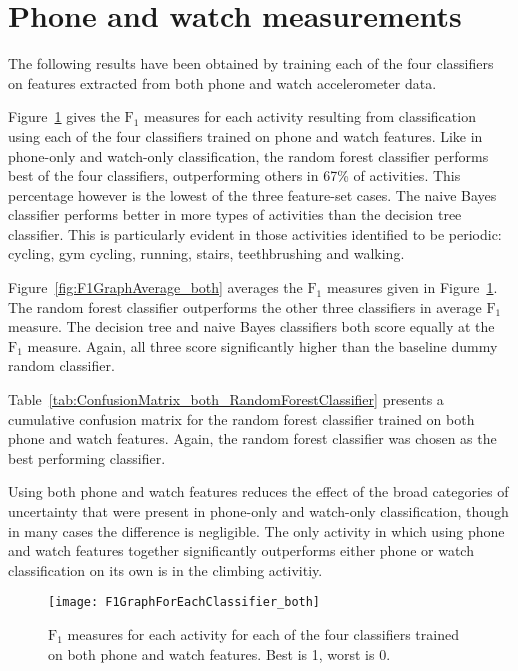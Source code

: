   
  \section{Phone and watch measurements}
    The following results have been obtained by training each of the four classifiers on features extracted from both phone and watch accelerometer data.
    
    Figure~\ref{fig:F1GraphForEachClassifier_both} gives the $\mathrm{F}_1$ measures for each activity resulting from classification using each of the four classifiers trained on phone and watch features. Like in phone-only and watch-only classification, the random forest classifier performs best of the four classifiers, outperforming others in 67\% of activities. This percentage however is the lowest of the three feature-set cases. The naive Bayes classifier performs better in more types of activities than the decision tree classifier. This is particularly evident in those activities identified to be  periodic: cycling, gym cycling, running, stairs, teethbrushing and walking.
    
    Figure~\ref{fig:F1GraphAverage_both} averages the $\mathrm{F}_1$ measures given in Figure~\ref{fig:F1GraphForEachClassifier_both}. The random forest classifier outperforms the other three classifiers in average $\mathrm{F}_1$ measure. The decision tree and naive Bayes classifiers both score equally at the $\mathrm{F}_1$ measure. Again, all three score significantly higher than the baseline dummy random classifier.
    
    Table~\ref{tab:ConfusionMatrix_both_RandomForestClassifier} presents a cumulative confusion matrix for the random forest classifier trained on both phone and watch features. Again, the random forest classifier was chosen as the best performing classifier.
    
    Using both phone and watch features reduces the effect of the broad categories of uncertainty that were present in phone-only and watch-only classification, though in many cases the difference is negligible. The only activity in which using phone and watch features together significantly outperforms either phone or watch classification on its own is in the climbing activitiy.
    
    \begin{figure}
      \centering
      \texttt{[image: F1GraphForEachClassifier\_both]}
      \caption[$\mathrm{F}_1$ measures for each activity for each of the four classifiers trained on both phone and watch features]{$\mathrm{F}_1$ measures for each activity for each of the four classifiers trained on both phone and watch features. Best is 1, worst is 0.}
      \label{fig:F1GraphForEachClassifier_both}
    \end{figure}
    
